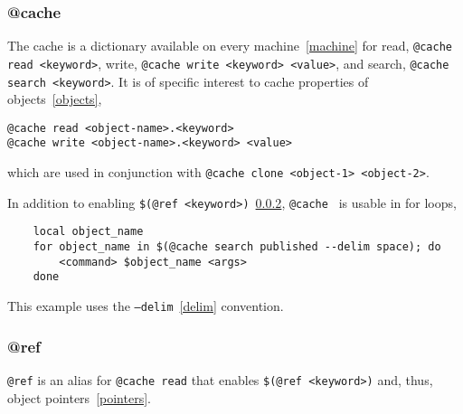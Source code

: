 \subsubsection{@cache}
\label{cache}

The cache is a dictionary available on every machine~\ref{machine} for read, \texttt{@cache read <keyword>}, write, \texttt{@cache write <keyword> <value>}, and search, \texttt{@cache search <keyword>}. It is of specific interest to cache properties of objects~\ref{objects},
%
\begin{verbatim}
@cache read <object-name>.<keyword>
@cache write <object-name>.<keyword> <value>
\end{verbatim}
%
which are used in conjunction with \texttt{@cache clone <object-1> <object-2>}.

In addition to enabling \texttt{\$(@ref <keyword>)}~\ref{ref}, \texttt{@cache } is usable in for loops,
%
\begin{verbatim}
    local object_name
    for object_name in $(@cache search published --delim space); do
        <command> $object_name <args>
    done
\end{verbatim}
%
This example uses the \texttt{--delim}~\ref{delim} convention.

\subsubsection{@ref}
\label{ref}

\texttt{@ref} is an alias for \texttt{@cache read} that enables \texttt{\$(@ref <keyword>)} and, thus, object pointers~\ref{pointers}.